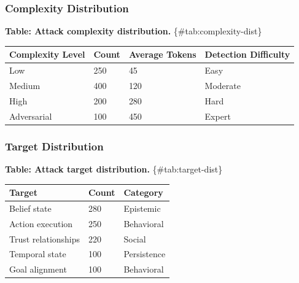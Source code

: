 \documentclass[
]{article}
\newcounter{none} %
\begin{document}
\subsubsection{Complexity Distribution}\label{sec:complexity-dist}

\textbf{Table: Attack complexity distribution.}
\{\#tab:complexity-dist\}

{\def\LTcaptype{none} %
\begin{longtable}[]{@{}llll@{}}
\toprule\noalign{}
Complexity Level & Count & Average Tokens & Detection Difficulty \\
\midrule\noalign{}
\endhead
\bottomrule\noalign{}
\endlastfoot
Low & 250 & 45 & Easy \\
Medium & 400 & 120 & Moderate \\
High & 200 & 280 & Hard \\
Adversarial & 100 & 450 & Expert \\
\end{longtable}
}

\subsubsection{Target Distribution}\label{sec:target-dist}

\textbf{Table: Attack target distribution.} \{\#tab:target-dist\}

{\def\LTcaptype{none} %
\begin{longtable}[]{@{}lll@{}}
\toprule\noalign{}
Target & Count & Category \\
\midrule\noalign{}
\endhead
\bottomrule\noalign{}
\endlastfoot
Belief state & 280 & Epistemic \\
Action execution & 250 & Behavioral \\
Trust relationships & 220 & Social \\
Temporal state & 100 & Persistence \\
Goal alignment & 100 & Behavioral \\
\end{longtable}
}
\end{document}
